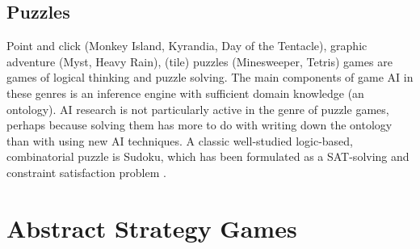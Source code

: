 \subsection{Puzzles}
Point and click (Monkey Island, Kyrandia, Day of the Tentacle), graphic adventure (Myst, Heavy Rain), (tile) puzzles (Minesweeper, Tetris) games are games of logical thinking and puzzle solving. The main components of game AI in these genres is an inference engine with sufficient domain knowledge (an ontology). AI research is not particularly active in the genre of puzzle games, perhaps because solving them has more to do with writing down the ontology than with using new AI techniques. A classic well-studied logic-based, combinatorial puzzle is Sudoku, which has been formulated as a SAT-solving \citep{lynce2006sudoku} and constraint satisfaction problem \citep{Simonis2005}.


\section{Abstract Strategy Games}
